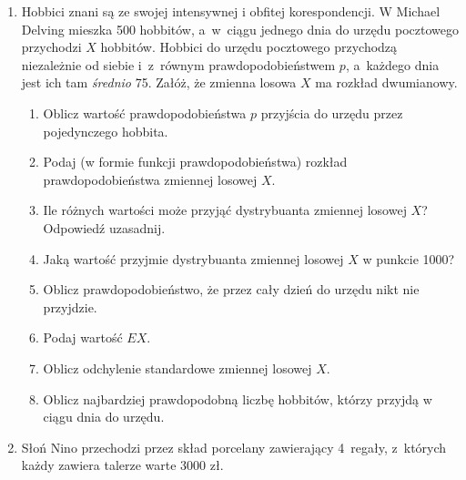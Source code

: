 \documentclass[twoside]{mwart}
\newcommand{\ans}[1]{}
\newenvironment{ansenv}{\comment}{\endcomment}
\newenvironment{ansenv}{\paragraph{Odpowiedź:}}{}
\newcommand{\ans}[1]{\begin{ansenv}#1\end{ansenv}}
\begin{document}
\begin{enumerate}
\begin{enumerate}
\end{enumerate}
\item Hobbici znani są ze swojej intensywnej i obfitej korespondencji. W Michael
Delving mieszka 500 hobbitów, a~w~ciągu jednego dnia do urzędu pocztowego
przychodzi $X$ hobbitów. Hobbici do urzędu pocztowego przychodzą niezależnie od
siebie i~z~równym prawdopodobieństwem $p$, a~każdego dnia jest ich tam
\emph{średnio} 75. Załóż, że zmienna losowa $X$ ma rozkład dwumianowy.
\begin{enumerate}
\item Oblicz wartość prawdopodobieństwa $p$ przyjścia do urzędu przez pojedynczego hobbita.
\ans{
	Hobbici przychodzą niezależnie i z równym prawdopodobieństwem, jest ich też stała liczba $n=500$, a zatem mamy do czynienia z modelem rozkładu dwumianowego. Znamy średnią, więc łatwo obliczyć prawdopodobieństwo:
	\[ p=\frac{EX}{n}=\frac{75}{500}=\frac{3}{20} \]
}
\item Podaj  (w formie funkcji prawdopodobieństwa) rozkład prawdopodobieństwa zmiennej losowej $X$.
\ans{
	\[ P(X=k)={500 \choose k}\left(\frac{3}{20}\right)^k\left(\frac{17}{20}\right)^{500-k} k\in\{0,1,\ldots,500\} \]
}
\item Ile różnych wartości może przyjąć dystrybuanta zmiennej losowej $X$? Odpowiedź uzasadnij.
\ans{
	Mamy 500 hobbitów, a zatem 501 punktów skokowych (0 do 500). Dystrybuanta zmiennej losowej typu skokowego rośnie w każdym punkcie skokowym, zatem mamy 501 wzrostów. Żeby mieć 501 wzrostów musimy mieć 502 różne wartości.
}
\item Jaką wartość przyjmie dystrybuanta zmiennej losowej $X$ w punkcie 1000?
\ans{
	\[F(1000)=P(X\leq 1000)=1\]
}
\item Oblicz prawdopodobieństwo, że przez cały dzień do urzędu nikt nie przyjdzie.
\ans{
	\[ P(X=0)=\left(\frac{17}{20}\right)^{500} \approx 0 \]
}
\item Podaj wartość $EX$.
\ans{
	\[ EX=75 \] (wystarczy przepisać z treści zadania)
}
\item Oblicz odchylenie standardowe zmiennej losowej $X$.
\ans{
	\[ DX=\sqrt{np(1-p)}=\sqrt{500\cdot\frac{3}{20}\cdot\frac{17}{20}}\approx 7{,}98 \]
}
\item Oblicz najbardziej prawdopodobną liczbę hobbitów, którzy przyjdą w ciągu dnia do urzędu.
\ans{
	Iloczyn $(n+1)p$ nie jest liczbą całkowitą, zatem bierzemy z niego podłogę:
	\[\lfloor(n+1)p\rfloor = 75 \]
}
\end{enumerate}
\item Słoń Nino przechodzi przez skład porcelany zawierający 4~regały, z~których każdy zawiera talerze warte 3000 zł.

\end{enumerate}
\end{document}
